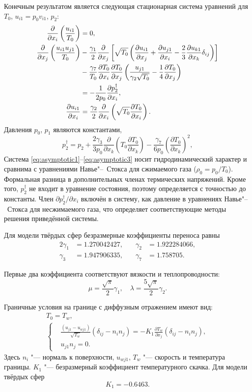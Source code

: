 \documentclass[english,russian,a4paper,10pt]{article}
\newcommand{\pder}[2][]{\frac{\partial#1}{\partial#2}}
\begin{document}
Конечным результатом является следующая стационарная система уравнений для \(T_0\), \(u_{i1} = p_0v_{i1}\), \(p_2\):
\begin{align}
	\pder{x_i}\left(\frac{u_{i1}}{T_0}\right) &= 0, \label{eq:asymptotic1} \\
	\pder{x_j}\left(\frac{u_{i1}u_{j1}}{T_0}\right)
		&-\frac{\gamma_1}2\pder{x_j}\left[\sqrt{T_0}\left(
			\pder[u_{i1}]{x_j}+\pder[u_{j1}]{x_i}-\frac23\pder[u_{k1}]{x_k}\delta_{ij}\right
		)\right] \notag\\
		&- \frac{\gamma_7}{T_0}\pder[T_0]{x_i}\pder[T_0]{x_j}\left(\frac{u_{j1}}{\gamma_2\sqrt{T_0}} - \frac{1}4\pder[T_0]{x_j}\right) \notag\\
		&= -\frac1{2p_0}\pder[p_2^\dag]{x_i}, \label{eq:asymptotic2} \\
	\pder[u_{i1}]{x_i} &= \frac{\gamma_2}2\pder{x_i}\left(\sqrt{T_0}\pder[T_0]{x_i}\right). \label{eq:asymptotic3}
\end{align}
Давления \(p_0\), \(p_1\) являются константами,
\[ 
	p_2^\dag = p_2 + 
		\frac{2\gamma_3}{3p_0}\pder{x_k}\left(T_0\pder[T_0]{x_k}\right) -
		\frac{\gamma_7}{6p_0}\left(\pder[T_0]{x_k}\right)^2,
\]
Система \eqref{eq:asymptotic1}--\eqref{eq:asymptotic3} носит гидродинамический характер
и сравнима с уравнениями Навье"--~Стокса для сжимаемого газа (\(\rho_0 = p_0/T_0\)).
Формальная разница в дополнительных членах термических напряжений.
Кроме того, \(p_2^\dag\) не входит в уравнение состояния, поэтому определяется с точностью до константы.
Член \(\partial{p_2^\dag}/\partial{x_i}\) включён в систему,
как давление в уравнениях Навье"--~Стокса для несжимаемого газа,
что определяет соответствующие методы решения приведённой системы.

Для модели твёрдых сфер безразмерные коэффициенты переноса равны
\begin{alignat*}{2}
	\gamma_1 &= 1.270042427, &\quad \gamma_2 &= 1.922284066, \\
	\gamma_3 &= 1.947906335, &\quad \gamma_7 &= 1.758705.
\end{alignat*}

Первые два коэффициента соответствуют вязкости и теплопроводности:
\[ \mu = \frac{\sqrt\pi}2\gamma_1, \quad \lambda = \frac{5\sqrt\pi}2\gamma_2. \]

Граничные условия на границе с диффузным отражением имеют вид:
\begin{gather}
	T_0 = T_w, \label{eq:bound:T} \\
	\left\{
	\begin{aligned}
		& \frac{(u_{j1}-u_{wj1})}{\sqrt{T_w}}(\delta_{ij}-n_in_j) = 
			-K_1\pder[T_w]{x_j}(\delta_{ij}-n_in_j), \\
		& u_{j1}n_j = 0.
	\end{aligned}
	\right. \label{eq:bound:v}
\end{gather}
Здесь \(n_i\) "--- нормаль к поверхности, \(u_{wj1}\), \(T_w\) "--- скорость и температура границы.
\(K_1\) "--- безразмерный коэффициент температурного скачка. Для модели твёрдых сфер 
\[ K_1 = -0.6463. \]
\end{document}
